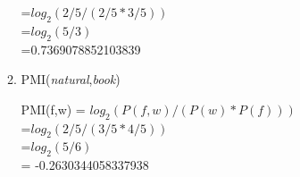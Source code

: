 \documentclass[11pt]{article}
\begin{document}
\begin{enumerate}
\begin{enumerate}
=$log_2( 2/5 / (2/5 *3/5) )$\\

=$log_2(5/3)$\\

=0.7369078852103839\\


\item PMI({\it natural},{\it book})

PMI(f,w) = $log_2 (P(f,w) / (P(w)*P(f))) $\\

=$log_2( 2/5 / (3/5 *4/5) )$\\

=$log_2(5/6)$\\

= -0.2630344058337938\\


\end{enumerate}



\end{enumerate}  %
\end{document}
